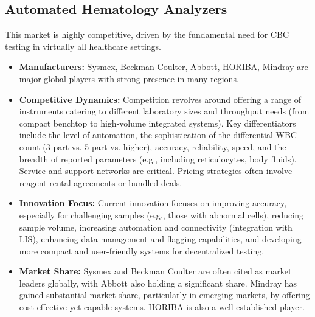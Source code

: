 \documentclass{article}
\begin{document}
\subsection{Automated Hematology Analyzers}
This market is highly competitive, driven by the fundamental need for CBC testing in virtually all healthcare settings.
\begin{itemize}
    \item \textbf{Manufacturers:} Sysmex, Beckman Coulter, Abbott, HORIBA, Mindray are major global players with strong presence in many regions.
    \item \textbf{Competitive Dynamics:} Competition revolves around offering a range of instruments catering to different laboratory sizes and throughput needs (from compact benchtop to high-volume integrated systems). Key differentiators include the level of automation, the sophistication of the differential WBC count (3-part vs. 5-part vs. higher), accuracy, reliability, speed, and the breadth of reported parameters (e.g., including reticulocytes, body fluids). Service and support networks are critical. Pricing strategies often involve reagent rental agreements or bundled deals.
    \item \textbf{Innovation Focus:} Current innovation focuses on improving accuracy, especially for challenging samples (e.g., those with abnormal cells), reducing sample volume, increasing automation and connectivity (integration with LIS), enhancing data management and flagging capabilities, and developing more compact and user-friendly systems for decentralized testing.
    \item \textbf{Market Share:} Sysmex and Beckman Coulter are often cited as market leaders globally, with Abbott also holding a significant share. Mindray has gained substantial market share, particularly in emerging markets, by offering cost-effective yet capable systems. HORIBA is also a well-established player.
\end{itemize}
\end{document}
